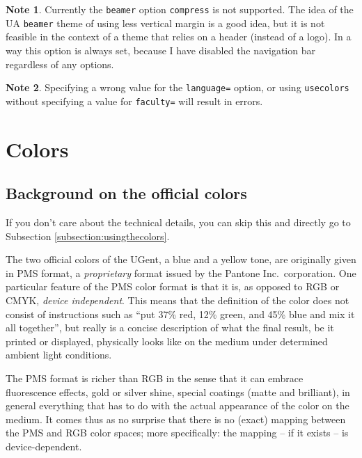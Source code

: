 \documentclass[a4paper,10pt]{article}
\theoremstyle{definition}
\newtheorem{note}{Note}
\begin{document}
\begin{note}
  Currently the \texttt{beamer} option \verb|compress| is not supported. The idea of the UA \texttt{beamer} theme of using less vertical margin is a good idea, but it is not feasible in the context of a theme that relies on a header (instead of a logo). In a way this option is always set, because I have disabled the navigation bar regardless of any options.
\end{note}

\begin{note}
  Specifying a wrong value for the \verb|language=| option, or using \verb|usecolors| without specifying a value for \verb|faculty=| will result in errors.
\end{note}


\section{Colors}
\label{section:colors}

\subsection{Background on the official colors}
If you don't care about the technical details, you can skip this and directly go to Subsection \ref{subsection:usingthecolors}.

\vspace{1em}

The two official colors of the UGent, a blue and a yellow tone, are originally given in PMS format, a \emph{proprietary} format issued by the Pantone Inc.\ corporation. One particular feature of the PMS color format is that it is, as opposed to RGB or CMYK, \emph{device independent}. This means that the definition of the color does not consist of instructions such as \enquote{put 37\% red, 12\% green, and 45\% blue and mix it all together}, but really is a concise description of what the final result, be it printed or displayed, physically looks like on the medium under determined ambient light conditions.

The PMS format is richer than RGB in the sense that it can embrace fluorescence effects, gold or silver shine, special coatings (matte and brilliant), in general everything that has to do with the actual appearance of the color on the medium. It comes thus as no surprise that there is no (exact) mapping between the PMS and RGB color spaces; more specifically: the mapping -- if it exists -- is device-dependent.
\end{document}
